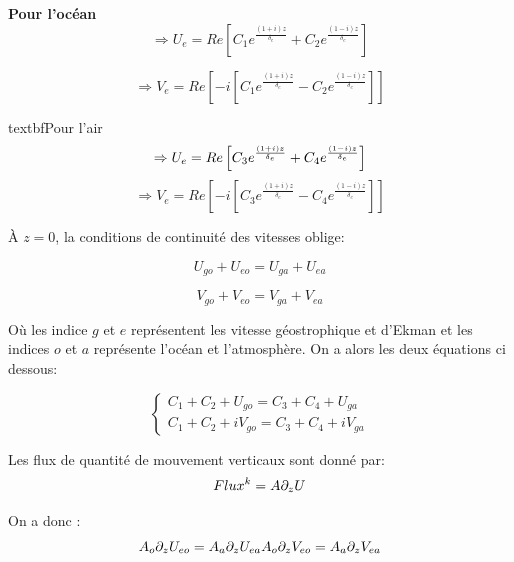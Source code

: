 \documentclass[11pt,a4paper,titlepage]{article}
\begin{document}
\textbf{Pour l'océan}
\begin{equation}
\Rightarrow U_e =  Re \left[ C_1 e^{\frac{(1+i)z}{\delta_e}}+C_2 e^{\frac{(1-i)z}{\delta_e}} \right] 
\end{equation}

\begin{equation}
\Rightarrow V_e =  Re \left[-i \left[C_1 e^{\frac{(1+i)z}{\delta_e}}-C_2 e^{\frac{(1-i)z}{\delta_e}}\right]\right]
\end{equation}

\pagebreak

textbf{Pour l'air}
\begin{equation}
\Rightarrow U_e =  Re \left[ C_3 e^{\frac{(1+i)z}{\delta_e}}+C_4 e^{\frac{(1-i)z}{\delta_e}} \right] \linebreak
\end{equation}
\begin{equation}
\Rightarrow V_e =  Re \left[-i \left[C_3 e^{\frac{(1+i)z}{\delta_e}}-C_4 e^{\frac{(1-i)z}{\delta_e}}\right]\right]
\end{equation}

À $z=0$, la conditions de continuité des vitesses oblige:

\begin{equation}
U_{go}+U_{eo} = U_{ga}+U_{ea}
\end{equation}

\begin{equation}
V_{go}+V_{eo} = V_{ga}+V_{ea}
\end{equation}

Où les indice $g$ et $e$ représentent les vitesse géostrophique et d'Ekman et les indices $o$ et $a$ représente l'océan et l'atmosphère. On a alors les deux équations ci dessous:

\begin{equation}
\begin{cases} 
C_1 + C_2 + U_{go} = C_3 + C_4 + U_{ga} \\
C_1 + C_2 + i V_{go} = C_3 + C_4 + i V_{ga} 
\end{cases}
\end{equation}

Les flux de quantité de mouvement verticaux sont donné par:
\begin{equation}
Flux^k = A \partial_z U 
\end{equation}

On a donc :
\begin{equation}
A_{o} \partial_z U_{eo} = A_{a} \partial_z U_{ea} 
A_{o} \partial_z V_{eo} = A_{a} \partial_z V_{ea} 
\end{equation}
\end{document}
